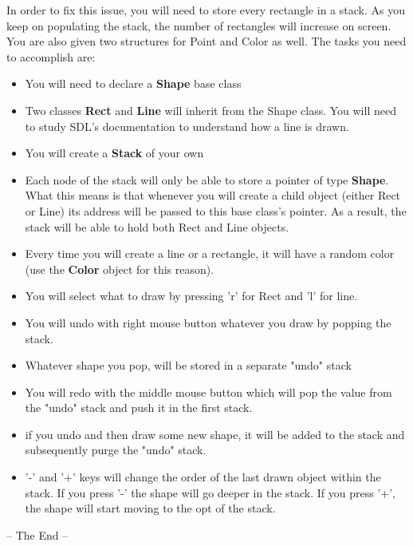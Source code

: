 \documentclass[a4paper,12pt]{article}
\begin{document}
	\noindent In order to fix this issue, you will need to store every rectangle in a stack. As you keep on populating the stack, the number of rectangles will increase on screen. You are also given two structures for Point and Color as well. The tasks you need to accomplish are:\smallskip\\
	
		\begin{itemize}
		\item You will need to declare a \textbf{Shape} base class
		\item Two classes \textbf{Rect} and \textbf{Line} will inherit from the Shape class. You will need to study SDL's documentation to understand how a line is drawn.
		\item You will create a \textbf{Stack} of your own
		\item Each node of the stack will only be able to store a pointer of type \textbf{Shape}. What this means is that whenever you will create a child object (either Rect or Line) its address will be passed to this base class's pointer. As a result, the stack will be able to hold both Rect and Line objects.
		\item Every time you will create a line or a rectangle, it will have a random color (use the \textbf{Color} object for this reason).
		\item You will select what to draw by pressing 'r' for Rect and 'l' for line.
		\item You will undo with right mouse button whatever you draw by popping the stack.
		\item Whatever shape you pop, will be stored in a separate "undo" stack
		\item You will redo with the middle mouse button which will pop the value from the "undo" stack and push it in the first stack.
		\item if you undo and then draw some new shape, it will be added to the stack and subsequently purge the "undo" stack.
		\item '-' and '+' keys will change the order of the last drawn object within the stack. If you press '-' the shape will go deeper in the stack. If you press '+', the shape will start moving to the opt of the stack.
	\end{itemize}
	
	

	\begin{center}
		-- The End --
	\end{center}
	\newpage
	
	
\end{document}

